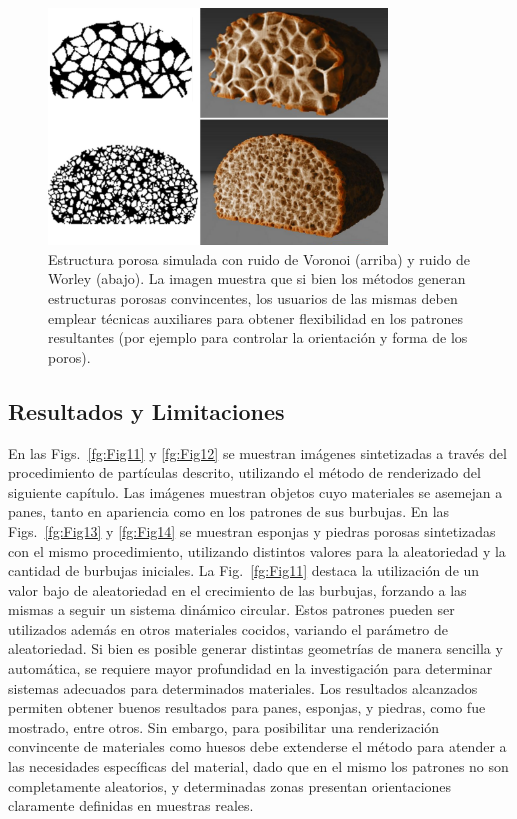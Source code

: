 \clearpage

\begin{figure}
  \centerline{\includegraphics[width=9cm]{figures/Fig9CAVW}}
  \caption{Estructura porosa simulada con ruido de Voronoi (arriba) y ruido de Worley (abajo). La imagen muestra que si bien los métodos generan estructuras porosas convincentes, los usuarios de las mismas deben emplear técnicas auxiliares para obtener flexibilidad en los patrones resultantes (por ejemplo para controlar la orientación y forma de los poros).}
  \label{fg:Fig9}
\end{figure}

\subsection{Resultados y Limitaciones}
En las Figs.~\ref{fg:Fig11} y \ref{fg:Fig12} se muestran imágenes sintetizadas a través del procedimiento de partículas descrito, utilizando el método de renderizado del siguiente capítulo.
Las imágenes muestran objetos cuyo materiales se asemejan a panes, tanto en apariencia como en los patrones de sus burbujas.
En las Figs.~\ref{fg:Fig13} y \ref{fg:Fig14} se muestran esponjas y piedras porosas sintetizadas con el mismo procedimiento, utilizando distintos valores para la aleatoriedad y la cantidad de burbujas iniciales.
La Fig.~\ref{fg:Fig11} destaca la utilización de un valor bajo de aleatoriedad en el crecimiento de las burbujas, forzando a las mismas a seguir un sistema dinámico circular.
Estos patrones pueden ser utilizados adem\'as en otros materiales cocidos, variando el par\'ametro de aleatoriedad.
Si bien es posible generar distintas geometrías de manera sencilla y automática, se requiere mayor profundidad en la investigación para determinar sistemas adecuados para determinados materiales.
Los resultados alcanzados permiten obtener buenos resultados para panes, esponjas, y piedras, como fue mostrado, entre otros.
Sin embargo, para posibilitar una renderización convincente de materiales como huesos debe extenderse el método para atender a las necesidades específicas del material, dado que en el mismo los patrones no son completamente aleatorios, y determinadas zonas presentan orientaciones claramente definidas en muestras reales.


